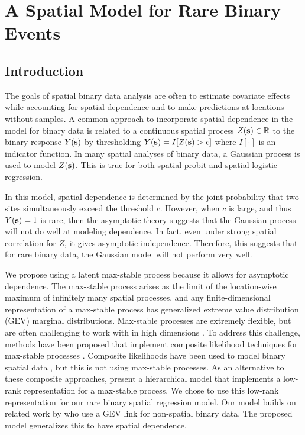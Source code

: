 \chapter{A Spatial Model for Rare Binary Events}
\label{chap:three}

\section{Introduction}\label{rbs:intro}

The goals of spatial binary data analysis are often to estimate covariate effects while accounting for spatial dependence and to make predictions at locations without samples.
A common approach to incorporate spatial dependence in the model for binary data is related to a continuous spatial process $Z(\mathbf{s}) \in \mathbb{R}$ to the binary response $Y(\mathbf{s})$ by thresholding $Y(\mathbf{s}) = I[Z(\mathbf{s}) > c]$ where $I[\cdot]$ is an indicator function.
In many spatial analyses of binary data, a Gaussian process is used to model $Z(\mathbf{s})$.
This is true for both spatial probit and spatial logistic regression.

In this model, spatial dependence is determined by the joint probability that two sites simultaneously exceed the threshold $c$.
However, when $c$ is large, and thus $Y(\mathbf{s}) = 1$ is rare, then the asymptotic theory suggests that the Gaussian process will not do well at modeling dependence.
In fact, even under strong spatial correlation for $Z$, it gives asymptotic independence.
Therefore, this suggests that for rare binary data, the Gaussian model will not perform very well.

We propose using a latent max-stable process \citep{deHaan1984} because it allows for asymptotic dependence.
The max-stable process arises as the limit of the location-wise maximum of infinitely many spatial processes, and any finite-dimensional representation of a max-stable process has generalized extreme value distribution (GEV) marginal distributions.
Max-stable processes are extremely flexible, but are often challenging to work with in high dimensions \citep{Wadsworth2014,Thibaud2013a}.
To address this challenge, methods have been proposed that implement composite likelihood techniques for max-stable processes \citep{Padoan2010,Genton2011,Huser2014}.
Composite likelihoods have been used to model binary spatial data \citep{Heagerty1998}, but this is not using max-stable processes.
As an alternative to these composite approaches, \citet{Reich2012} present a hierarchical model that implements a low-rank representation for a max-stable process.
We chose to use this low-rank representation for our rare binary spatial regression model.
Our model builds on related work by \citet{Wang2010} who use a GEV link for non-spatial binary data.
The proposed model generalizes this to have spatial dependence. 


